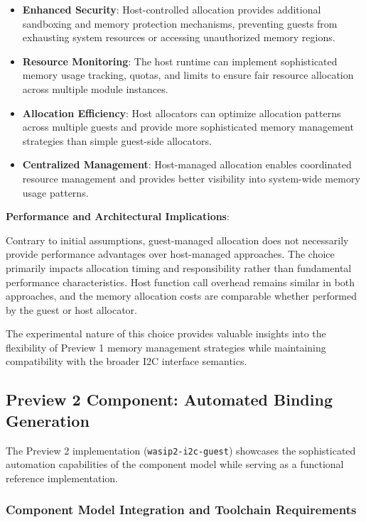 \begin{itemize}
    \item \textbf{Enhanced Security}: Host-controlled allocation provides additional sandboxing and memory protection mechanisms, preventing guests from exhausting system resources or accessing unauthorized memory regions.
    \item \textbf{Resource Monitoring}: The host runtime can implement sophisticated memory usage tracking, quotas, and limits to ensure fair resource allocation across multiple module instances.
    \item \textbf{Allocation Efficiency}: Host allocators can optimize allocation patterns across multiple guests and provide more sophisticated memory management strategies than simple guest-side allocators.
    \item \textbf{Centralized Management}: Host-managed allocation enables coordinated resource management and provides better visibility into system-wide memory usage patterns.
\end{itemize}

\textbf{Performance and Architectural Implications}:

Contrary to initial assumptions, guest-managed allocation does not necessarily provide performance advantages over host-managed approaches. The choice primarily impacts allocation timing and responsibility rather than fundamental performance characteristics. Host function call overhead remains similar in both approaches, and the memory allocation costs are comparable whether performed by the guest or host allocator.

The experimental nature of this choice provides valuable insights into the flexibility of Preview 1 memory management strategies while maintaining compatibility with the broader I2C interface semantics.

\subsection{Preview 2 Component: Automated Binding Generation}

The Preview 2 implementation (\texttt{wasip2-i2c-guest}) showcases the sophisticated automation capabilities of the component model while serving as a functional reference implementation.

\subsubsection{Component Model Integration and Toolchain Requirements}


